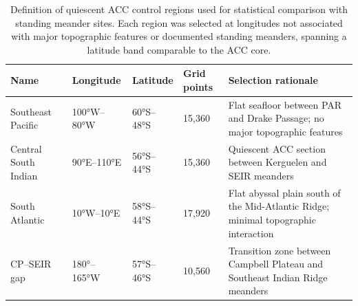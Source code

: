 \begin{table}[ht]
\centering
\caption{Definition of quiescent ACC control regions used for statistical comparison with standing meander sites. Each region was selected at longitudes not associated with major topographic features or documented standing meanders, spanning a latitude band comparable to the ACC core.}
\label{tab:control_regions}
\small
\begin{tabular}{llllp{5.5cm}}
\hline
Name & Longitude & Latitude & Grid points & Selection rationale \\
\hline
Southeast Pacific & 100°W–80°W & 60°S–48°S & 15,360 & Flat seafloor between PAR and Drake Passage; no major topographic features \\
Central South Indian & 90°E–110°E & 56°S–44°S & 15,360 & Quiescent ACC section between Kerguelen and SEIR meanders \\
South Atlantic & 10°W–10°E & 58°S–44°S & 17,920 & Flat abyssal plain south of the Mid-Atlantic Ridge; minimal topographic interaction \\
CP–SEIR gap & 180°–165°W & 57°S–46°S & 10,560 & Transition zone between Campbell Plateau and Southeast Indian Ridge meanders \\
\hline
\end{tabular}
\end{table}
